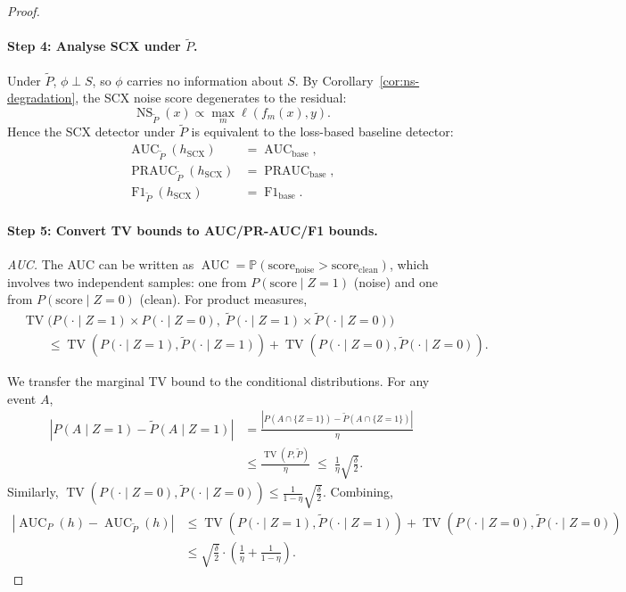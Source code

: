 \begin{proof}
\paragraph{Step 4: Analyse SCX under $\tilde{P}$.}
Under $\tilde{P}$, $\phi \perp S$, so $\phi$ carries no information about $S$.
By Corollary~\ref{cor:ns-degradation}, the SCX noise score degenerates to the
residual:
\[
\operatorname{NS}_{\tilde{P}}(x) \propto \max_m \ell(f_m(x), y).
\]
Hence the SCX detector under $\tilde{P}$ is equivalent to the loss-based
baseline detector:
\begin{align}
\operatorname{AUC}_{\tilde{P}}(h_{\text{SCX}}) &= \operatorname{AUC}_{\text{base}},
\label{eq:base-equiv-au} \\
\operatorname{PRAUC}_{\tilde{P}}(h_{\text{SCX}}) &= \operatorname{PRAUC}_{\text{base}},
\label{eq:base-equiv-prau} \\
\operatorname{F1}_{\tilde{P}}(h_{\text{SCX}}) &= \operatorname{F1}_{\text{base}}.
\label{eq:base-equiv-f1}
\end{align}

\paragraph{Step 5: Convert TV bounds to AUC/PR-AUC/F1 bounds.}

\emph{AUC.} The AUC can be written as
$\operatorname{AUC} = \mathbb{P}(\text{score}_{\text{noise}} >
\text{score}_{\text{clean}})$, which involves two independent samples: one
from $P(\text{score} \mid Z=1)$ (noise) and one from
$P(\text{score} \mid Z=0)$ (clean). For product measures,
\begin{align*}
&\operatorname{TV}\bigl(P(\cdot\mid Z=1) \times P(\cdot\mid Z=0),\;
        \tilde{P}(\cdot\mid Z=1) \times \tilde{P}(\cdot\mid Z=0)\bigr) \\
&\qquad\leq \operatorname{TV}(P(\cdot\mid Z=1), \tilde{P}(\cdot\mid Z=1))
         + \operatorname{TV}(P(\cdot\mid Z=0), \tilde{P}(\cdot\mid Z=0)).
\end{align*}

We transfer the marginal TV bound to the conditional distributions. For any
event $A$,
\begin{align*}
|P(A \mid Z=1) - \tilde{P}(A \mid Z=1)|
&= \frac{|P(A \cap \{Z=1\}) - \tilde{P}(A \cap \{Z=1\})|}{\eta} \\
&\leq \frac{\operatorname{TV}(P, \tilde{P})}{\eta}
\;\leq\; \frac{1}{\eta}\sqrt{\frac{\delta}{2}}.
\end{align*}
Similarly,
$\operatorname{TV}(P(\cdot\mid Z=0), \tilde{P}(\cdot\mid Z=0))
\leq \frac{1}{1-\eta}\sqrt{\frac{\delta}{2}}$.
Combining,
\begin{align*}
|\operatorname{AUC}_P(h) - \operatorname{AUC}_{\tilde{P}}(h)|
&\leq \operatorname{TV}(P(\cdot\mid Z=1), \tilde{P}(\cdot\mid Z=1))
   + \operatorname{TV}(P(\cdot\mid Z=0), \tilde{P}(\cdot\mid Z=0)) \\
&\leq \sqrt{\frac{\delta}{2}}\cdot
   \left(\frac{1}{\eta} + \frac{1}{1-\eta}\right).
\label{eq:auc-tv-transfer}
\end{align*}


\end{proof}
